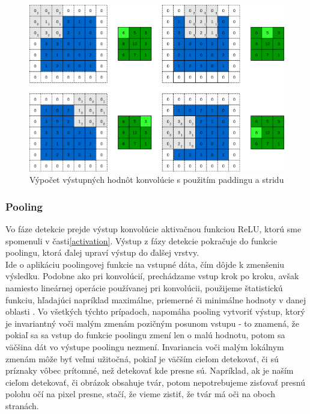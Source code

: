 \begin{figure}[H]
	\centering
	\includegraphics[width=1\linewidth]{img/cnn2}
	\caption{Výpočet výstupných hodnôt konvolúcie s použitím paddingu a stridu }
	\label{fig:cnn2}
\end{figure}

\subsubsection{Pooling}
Vo fáze detekcie prejde výstup konvolúcie aktivačnou funkciou ReLU, ktorú sme spomenuli v časti\ref{activation}. Výstup z fázy detekcie pokračuje do funkcie poolingu, ktorá ďalej upraví výstup do ďalšej vrstvy.\\ 

\indent Ide o aplikáciu poolingovej funkcie na vstupné dáta, čím dôjde k zmenšeniu výsledku.
Podobne ako pri konvolúcií, prechádzame vstup krok po kroku, avšak namiesto lineárnej operácie používanej pri konvolúcii, použijeme štatistickú funkciu, hľadajúci napríklad maximálne, priemerné či minimálne hodnoty v danej oblasti \cite{cs231n}.
Vo všetkých týchto prípadoch, napomáha pooling vytvoriť výstup, ktorý je invariantný voči malým zmenám pozičným posunom vstupu - to znamená, že pokiaľ sa sa vstup do funkcie poolingu zmení len o malú hodnotu, potom sa väčšina dát vo výstupe poolingu nezmení. 
Invariancia voči malým lokálnym zmenám môže byť veľmi užitočná, pokiaľ je väčším cieľom detekovať, či sú príznaky vôbec prítomné, než detekovať kde presne sú\cite{goodfellow2016deep}.
Napríklad, ak je naším cieľom detekovať, či obrázok obsahuje tvár, potom nepotrebujeme zisťovať presnú polohu očí na pixel presne, stačí, že vieme zistiť, že tvár má oči na oboch stranách. \\

